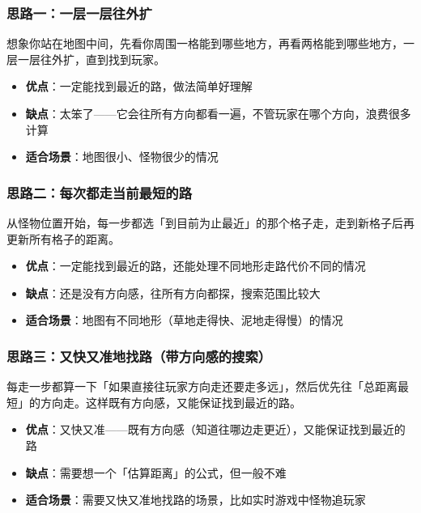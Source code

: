 \documentclass[12pt,a4paper]{article}
\begin{document}
\subsubsection{思路一：一层一层往外扩}

想象你站在地图中间，先看你周围一格能到哪些地方，再看两格能到哪些地方，一层一层往外扩，直到找到玩家。

\begin{itemize}[leftmargin=2em]
    \item \textbf{优点}：一定能找到最近的路，做法简单好理解
    \item \textbf{缺点}：太笨了——它会往所有方向都看一遍，不管玩家在哪个方向，浪费很多计算
    \item \textbf{适合场景}：地图很小、怪物很少的情况
\end{itemize}

\subsubsection{思路二：每次都走当前最短的路}

从怪物位置开始，每一步都选「到目前为止最近」的那个格子走，走到新格子后再更新所有格子的距离。

\begin{itemize}[leftmargin=2em]
    \item \textbf{优点}：一定能找到最近的路，还能处理不同地形走路代价不同的情况
    \item \textbf{缺点}：还是没有方向感，往所有方向都探，搜索范围比较大
    \item \textbf{适合场景}：地图有不同地形（草地走得快、泥地走得慢）的情况
\end{itemize}

\subsubsection{思路三：又快又准地找路（带方向感的搜索）}

每走一步都算一下「如果直接往玩家方向走还要走多远」，然后优先往「总距离最短」的方向走。这样既有方向感，又能保证找到最近的路。

\begin{itemize}[leftmargin=2em]
    \item \textbf{优点}：又快又准——既有方向感（知道往哪边走更近），又能保证找到最近的路
    \item \textbf{缺点}：需要想一个「估算距离」的公式，但一般不难
    \item \textbf{适合场景}：需要又快又准地找路的场景，比如实时游戏中怪物追玩家
\end{itemize}
\end{document}
